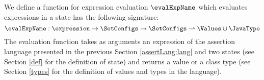  

%
%                                                     
%                                          
%                                       

 
We define a function for expression evaluation
 $\evalExpName$ which evaluates expressions in a state has the following signature:
$$
\evalExpName : \expression \rightarrow \SetConfigs  \rightarrow \SetConfigs  \rightharpoonup  \Values \cup \JavaType
$$
The evaluation function   takes as arguments an expression of the assertion language presented in the previous Section 
\ref{assertLang:lang} and two states (see Section \ref{def} for the definition of state)  and returns a value or a class type
(see Section \ref{types} for the definition of values and types in the language). 


